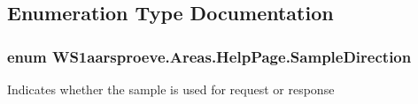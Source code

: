 \subsection{Enumeration Type Documentation}
\hypertarget{namespace_w_s1aarsproeve_1_1_areas_1_1_help_page_a68a9a343f44949e9781196ca9699289c}{}
\subsubsection[{Sample\+Direction}]{\setlength{\rightskip}{0pt plus 5cm}enum {\bf W\+S1aarsproeve.\+Areas.\+Help\+Page.\+Sample\+Direction}}\label{namespace_w_s1aarsproeve_1_1_areas_1_1_help_page_a68a9a343f44949e9781196ca9699289c}


Indicates whether the sample is used for request or response 

